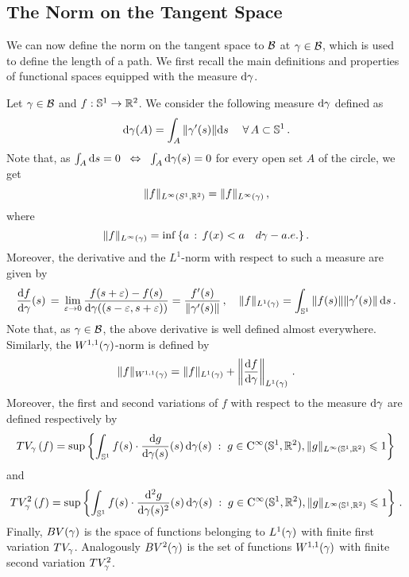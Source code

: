\subsection{The Norm on the Tangent Space}\label{tangent}

We can now define the norm on the tangent space to $\mathcal{B}$ at $\gamma\in \mathcal{B}$, which is used to define the length of a path. We first recall the main definitions and properties of functional spaces equipped with the measure $\mathrm{d} \gamma$.
 
\begin{defn}\label{dgm}

Let $\gamma\in\mathcal{B}$ and $f:\mathbb{S}^1\rightarrow \mathbb{R}^2$. 
We consider the following  measure $\mathrm{d}\gamma$ defined as 
$$
\mathrm{d} \gamma(A)=\int_A \|\gamma'(s)\| \mathrm{d} s \; \quad \forall \, A\subset \mathbb{S}^1\,.
$$
Note that, as 
$\int_A \mathrm{d} s =0 \;\; \Leftrightarrow \;\; \int_A \mathrm{d}\gamma(s)=0$
for every open set $A$ of the circle, we get 
\begin{equation}\label{eq-equi-norm-linf}
	\| f \|_{L^\infty(S^1,\mathbb{R}^2)} = \| f \|_{L^\infty(\gamma)}\,,
\end{equation} 
where 
$$\| f \|_{L^\infty(\gamma)} = \inf\,\{a\,:\, f(x)<a\quad d\gamma-a.e.\}\,. $$
Moreover, the derivative and the $L^1$-norm with respect to such a measure are given by
$$\frac{\mathrm{d} f}{\mathrm{d} \gamma}(s)\,=\, \underset{\varepsilon \rightarrow 0}{\lim} \, \frac{f(s+\varepsilon)-f(s)}{\mathrm{d} \gamma((s-\varepsilon, s+\varepsilon))} =\frac{f'(s)}{\|\gamma'(s)\|} \,,\quad \|f\|_{L^1(\gamma)} = \int_{\mathbb{S}^1} \|f(s)\|\|\gamma'(s)\|\, \mathrm{d} s\,. $$
Note that, as $\gamma\in \mathcal{B}$, the above derivative is well defined almost everywhere.
Similarly, the $W^{1,1}(\gamma)$-norm is defined by
\begin{equation}\label{w11-rel}
\|f\|_{W^{1,1}(\gamma)}= \|f\|_{L^1(\gamma)}  +  \left\| \frac{\mathrm{d} f}{\mathrm{d} \gamma}\right\|_{L^1(\gamma)}\,.
\end{equation}
Moreover,  the first and  second variations of $f$ with respect to the measure $\mathrm{d} \gamma$ are defined respectively by 
\begin{equation}\label{TV}	
	 TV_\gamma\left(f\right) = \sup \left\{ 
		\int_{\mathbb{S}^1}f(s)\cdot \frac{\mathrm{d} g}{\mathrm{d} \gamma(s)}(s)\, \mathrm{d}\gamma(s) 
	 \;:\; 
		g\in \mathrm{C}^{\infty}(\mathbb{S}^1,\mathbb{R}^2),\|g\|_{L^\infty(\mathbb{S}^1,{\mathbb R}^2)}\leqslant 1
	 \right\} \,
\end{equation}
 and
\begin{equation}\label{TV2}
	 TV_\gamma^2\left(f\right) = \sup \left\{ 
		\int_{\mathbb{S}^1}f(s)\cdot \frac{\mathrm{d}^2 g}{\mathrm{d} \gamma(s)^2}(s)\, \mathrm{d}\gamma(s) 
	 \;:\; 
		g\in \mathrm{C}^{\infty}(\mathbb{S}^1,\mathbb{R}^2),\|g\|_{L^\infty(\mathbb{S}^1,{\mathbb R}^2)}\leqslant 1
	 \right\} \,.
\end{equation}
Finally, $BV(\gamma)$ is the space of functions belonging to $L^1(\gamma)$ with finite first variation $TV_\gamma$. Analogously $BV^2(\gamma)$ is the set of functions $W^{1,1}(\gamma)$ with finite second variation $TV_\gamma^2$.

\end{defn}

